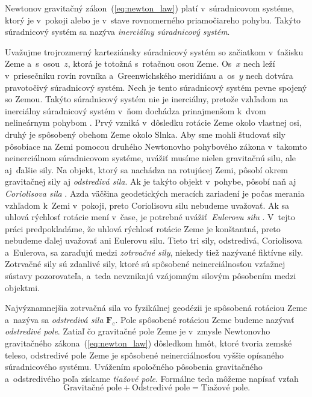\documentclass[a4paper, 12pt]{book}
\newcommand{\cidx}{\mathrm c}
\let\vec\mathbf
\begin{document}
Newtonov gravitačný zákon~(\ref{eq:newton_law}) platí v~súradnicovom systéme,
ktorý je v~pokoji alebo je v~stave rovnomerného priamočiareho pohybu.  Takýto
súradnicový systém sa nazýva \emph{inerciálny súradnicový systém}.

Uvažujme trojrozmerný karteziánsky súradnicový systém so začiatkom v~ťažisku 
Zeme a~s~osou~$z$, ktorá je totožná s~rotačnou osou Zeme.  Os~$x$ nech leží 
v~priesečníku rovín rovníka a~Greenwichského meridiánu a~os~$y$ nech dotvára 
pravotočivý súradnicový systém.  Nech je tento súradnicový systém pevne spojený 
so Zemou.  Takýto súradnicový systém nie je inerciálny, pretože vzhľadom na 
inerciálny súradnicový systém v~ňom dochádza prinajmenšom k~dvom nelineárnym 
pohybom \parencite{SansoGeoidDetermination}.  Prvý vzniká v~dôsledku rotácie 
Zeme okolo vlastnej osi, druhý je spôsobený obehom Zeme okolo Slnka.  Aby sme 
mohli študovať sily pôsobiace na Zemi pomocou druhého Newtonovho pohybového 
zákona v~takomto neinerciálnom súradnicovom systéme, uvážiť musíme nielen 
gravitačnú silu, ale aj~ďalšie sily.  Na objekt, ktorý sa nachádza na rotujúcej 
Zemi, pôsobí okrem gravitačnej sily aj \emph{odstredivá sila}.  Ak je takýto 
objekt v~pohybe, pôsobí naň aj \emph{Coriolisova sila} 
\parencite{Torge1989,Jekeli2000,MoritzPhysicalGeodesy,SansoGeoidDetermination}.  
Azda väčšina geodetických meracích zariadení je počas merania vzhľadom k~Zemi 
v~pokoji, preto Coriolisovu silu nebudeme uvažovať.  Ak sa uhlová rýchlosť 
rotácie mení v~čase, je potrebné uvážiť~\emph{Eulerovu silu} 
\parencite{Torge1989,SansoGeoidDetermination}.  V~tejto práci predpokladáme, že 
uhlová rýchlosť rotácie Zeme je konštantná, preto nebudeme ďalej uvažovať ani 
Eulerovu silu.  Tieto tri sily, odstredivá, Coriolisova a~Eulerova, sa zaraďujú 
medzi \emph{zotrvačné sily}, niekedy tiež nazývané fiktívne sily.  Zotrvačné 
sily sú zdanlivé sily, ktoré sú spôsobené neinerciálnosťou vzťažnej sústavy 
pozorovateľa, a~teda nevznikajú vzájomným silovým pôsobením medzi objektmi.

Najvýznamnejšia zotrvačná sila vo fyzikálnej geodézii je spôsobená rotáciou 
Zeme a~nazýva sa \emph{odstredivá sila}
$\vec F_\cidx$.  Pole spôsobené rotáciou Zeme budeme nazývať \emph{odstredivé 
pole}.  Zatiaľ čo gravitačné pole Zeme je v~zmysle Newtonovho gravitačného 
zákona~(\ref{eq:newton_law}) dôsledkom hmôt, ktoré tvoria zemské teleso, 
odstredivé pole Zeme je spôsobené neinerciálnosťou vyššie opísaného 
súradnicového systému.  Uvážením spoločného pôsobenia gravitačného 
a~odstredivého poľa získame \emph{tiažové pole}.  Formálne teda môžeme napísať 
vzťah
%
\begin{equation*}
\textrm{Gravitačné pole} + \textrm{Odstredivé pole} = \textrm{Tiažové pole}{.}
\end{equation*}
\end{document}
